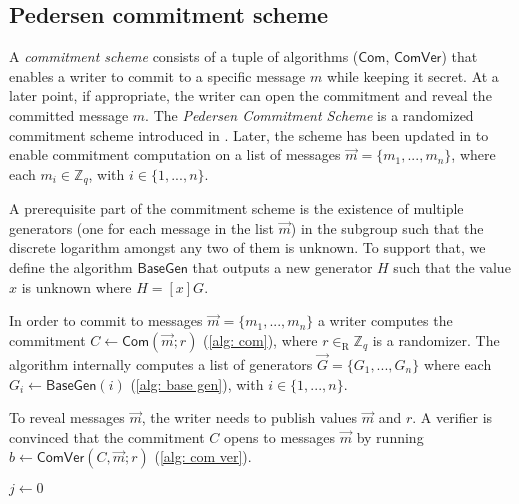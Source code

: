 \subsection{Pedersen commitment scheme}
A \textit{commitment scheme} consists of a tuple of algorithms ($\mathsf{Com}$, $\mathsf{ComVer}$) that enables a writer to commit to a specific message $m$ while keeping it secret. At a later point, if appropriate, the writer can open the commitment and reveal the committed message $m$. The \textit{Pedersen Commitment Scheme} is a randomized commitment scheme introduced in \cite{Pedersen91-commitment}. Later, the scheme has been updated in \cite{Bootle18} to enable commitment computation on a list of messages $\vec{m} = \{ m_1, ..., m_n \}$, where each $m_i \in \mathbb{Z}_q$, with $i \in \{ 1, ..., n \}$.

A prerequisite part of the commitment scheme is the existence of multiple generators (one for each message in the list  $\vec{m}$) in the subgroup such that the discrete logarithm amongst any two of them is unknown. To support that, we define the algorithm $\mathsf{BaseGen}$ that outputs a new generator $H$ such that the value $x$ is unknown where $H = [x]G$.

In order to commit to messages $\vec{m} = \{ m_1, ..., m_n \}$ a writer computes the commitment $C \gets \mathsf{Com}(\vec{m}; r)$ (\cref{alg: com}), where $r \in_\mathrm{R} \mathbb{Z}_q$ is a randomizer. The algorithm internally computes a list of generators $\vec{G} = \{ G_1, ..., G_n \}$ where each $G_i \gets \mathsf{BaseGen}(i)$ (\cref{alg: base gen}), with $i \in \{ 1, ..., n \}$.

To reveal messages $\vec{m}$, the writer needs to publish values $\vec{m}$ and $r$. A verifier is convinced that the commitment $C$ opens to messages $\vec{m}$ by running $b \gets \mathsf{ComVer}(C, \vec{m}; r)$ (\cref{alg: com ver}).

\begin{algorithm}[ht]
    \DontPrintSemicolon
    \caption{$\mathsf{BaseGen} (i)$}
    \label{alg: base gen}
    
    $j \gets 0$ \\
     
\end{algorithm}

